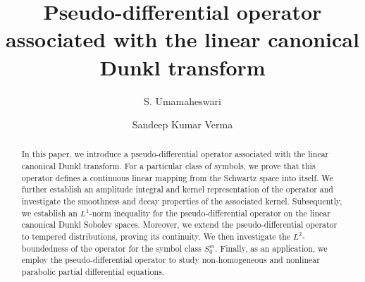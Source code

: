 \documentclass[12pt,a4paper,reqno]{amsproc}
\theoremstyle{definition}
\theoremstyle{remark}
\numberwithin{equation}{section}
\begin{document}
\setcounter{page}{1}
\begin{abstract}
In this paper, we introduce a pseudo-differential operator associated with the linear canonical Dunkl transform. For a particular class of symbols, we prove that this operator defines a continuous linear mapping from the Schwartz space into itself. We further establish an amplitude integral and kernel representation of the operator and investigate the smoothness and decay properties of the associated kernel. Subsequently, we establish an 
$L^1$-norm inequality for the pseudo-differential operator on the linear canonical Dunkl Sobolev spaces. Moreover, we extend the pseudo-differential operator to tempered distributions, proving its continuity. We then investigate the  $L^2$-boundedness of the operator for the symbol class 
$S^m_0$. Finally, as an application, we employ the pseudo-differential operator to study non-homogeneous and nonlinear parabolic partial differential equations.
\end{abstract}
\title[ Pseudo differential operator]{Pseudo-differential operator associated with the linear canonical Dunkl transform}
\author[S. Umamaheswari  and Sandeep Kumar Verma]{S. Umamaheswari  \and Sandeep Kumar Verma}

\address{Department of Mathematics, SRM University-AP, Andhra Pradesh, Guntur--522240, India}


 



\maketitle
\end{document}
